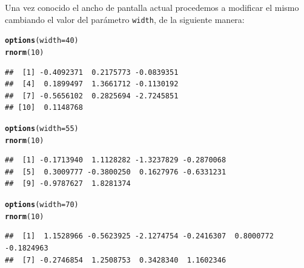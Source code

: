 \documentclass[11pt,a4paper,oneside]{book}\usepackage[]{graphicx}\usepackage[]{color}
\makeatletter
\newcommand{\hlnum}[1]{\textcolor[rgb]{0.686,0.059,0.569}{#1}}%
\newcommand{\hlstd}[1]{\textcolor[rgb]{0.345,0.345,0.345}{#1}}%
\newcommand{\hlkwc}[1]{\textcolor[rgb]{0.333,0.667,0.333}{#1}}%
\newcommand{\hlkwd}[1]{\textcolor[rgb]{0.737,0.353,0.396}{\textbf{#1}}}%
\newenvironment{kframe}{%
 \def\at@end@of@kframe{}%
 \ifinner\ifhmode%
  \def\at@end@of@kframe{\end{minipage}}%
  \begin{minipage}{\columnwidth}%
 \fi\fi%
 \def\FrameCommand##1{\hskip\@totalleftmargin \hskip-\fboxsep
 \colorbox{shadecolor}{##1}\hskip-\fboxsep
     \hskip-\linewidth \hskip-\@totalleftmargin \hskip\columnwidth}%
 \MakeFramed {\advance\hsize-\width
   \@totalleftmargin\z@ \linewidth\hsize
   \@setminipage}}%
 {\par\unskip\endMakeFramed%
 \at@end@of@kframe}
\newenvironment{knitrout}{}{} %
\makeatother
\begin{document}
\begin{itemize}
Una vez conocido el ancho de pantalla actual procedemos a modificar el mismo cambiando el valor del parámetro \texttt{width}, de la siguiente manera:

\begin{knitrout}
\color{fgcolor}\begin{kframe}
\begin{alltt}
\hlkwd{options}\hlstd{(}\hlkwc{width}\hlstd{=}\hlnum{40}\hlstd{)}
\hlkwd{rnorm}\hlstd{(}\hlnum{10}\hlstd{)}
\end{alltt}
\begin{verbatim}
##  [1] -0.4092371  0.2175773 -0.0839351
##  [4]  0.1899497  1.3661712 -0.1130192
##  [7] -0.5656102  0.2825694 -2.7245851
## [10]  0.1148768
\end{verbatim}
\end{kframe}
\end{knitrout}

\begin{knitrout}
\color{fgcolor}\begin{kframe}
\begin{alltt}
\hlkwd{options}\hlstd{(}\hlkwc{width}\hlstd{=}\hlnum{55}\hlstd{)}
\hlkwd{rnorm}\hlstd{(}\hlnum{10}\hlstd{)}
\end{alltt}
\begin{verbatim}
##  [1] -0.1713940  1.1128282 -1.3237829 -0.2870068
##  [5]  0.3009777 -0.3800250  0.1627976 -0.6331231
##  [9] -0.9787627  1.8281374
\end{verbatim}
\end{kframe}
\end{knitrout}

\begin{knitrout}
\color{fgcolor}\begin{kframe}
\begin{alltt}
\hlkwd{options}\hlstd{(}\hlkwc{width}\hlstd{=}\hlnum{70}\hlstd{)}
\hlkwd{rnorm}\hlstd{(}\hlnum{10}\hlstd{)}
\end{alltt}
\begin{verbatim}
##  [1]  1.1528966 -0.5623925 -2.1274754 -0.2416307  0.8000772 -0.1824963
##  [7] -0.2746854  1.2508753  0.3428340  1.1602346
\end{verbatim}
\end{kframe}
\end{knitrout}


\end{itemize}
\end{document}
